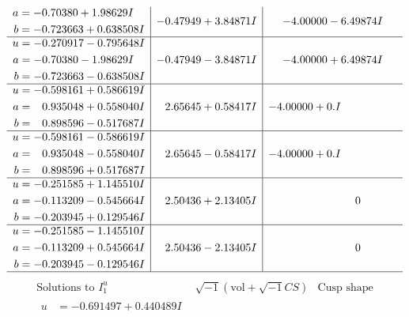 \documentclass[1p]{elsarticle_modified}
\theoremstyle{definition}
\newcommand{\I}{\sqrt{-1}}
\begin{document}
$$\begin{array}{c|c|c}
\begin{aligned}
a &= -0.70380 + 1.98629 I \\
b &= -0.723663 + 0.638508 I\end{aligned}
 & -0.47949 + 3.84871 I & -4.00000 - 6.49874 I \\ \hline\begin{aligned}
u &= -0.270917 - 0.795648 I \\
a &= -0.70380 - 1.98629 I \\
b &= -0.723663 - 0.638508 I\end{aligned}
 & -0.47949 - 3.84871 I & -4.00000 + 6.49874 I \\ \hline\begin{aligned}
u &= -0.598161 + 0.586619 I \\
a &= \phantom{-}0.935048 + 0.558040 I \\
b &= \phantom{-}0.898596 - 0.517687 I\end{aligned}
 & \phantom{-}2.65645 + 0.58417 I & -4.00000 + 0. I\phantom{ +0.000000I} \\ \hline\begin{aligned}
u &= -0.598161 - 0.586619 I \\
a &= \phantom{-}0.935048 - 0.558040 I \\
b &= \phantom{-}0.898596 + 0.517687 I\end{aligned}
 & \phantom{-}2.65645 - 0.58417 I & -4.00000 + 0. I\phantom{ +0.000000I} \\ \hline\begin{aligned}
u &= -0.251585 + 1.145510 I \\
a &= -0.113209 - 0.545664 I \\
b &= -0.203945 + 0.129546 I\end{aligned}
 & \phantom{-}2.50436 + 2.13405 I & \phantom{-0.000000 } 0 \\ \hline\begin{aligned}
u &= -0.251585 - 1.145510 I \\
a &= -0.113209 + 0.545664 I \\
b &= -0.203945 - 0.129546 I\end{aligned}
 & \phantom{-}2.50436 - 2.13405 I & \phantom{-0.000000 } 0\\
 \hline 
 \end{array}$$\newpage$$\begin{array}{c|c|c}  
\text{Solutions to }I^u_{1}& \I (\text{vol} + \sqrt{-1}CS) & \text{Cusp shape}\\
 \hline 
\begin{aligned}
u &= -0.691497 + 0.440489 I \\

\end{aligned}
\end{array}$$
\end{document}
